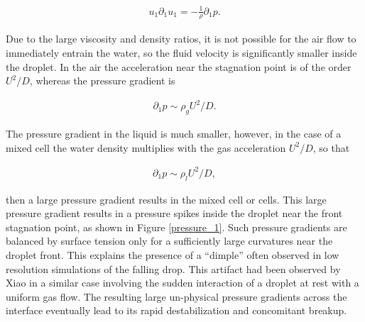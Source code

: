 \begin{align}
u_1 \partial_1 u_1 = - \frac 1 \rho \partial_1 p.
\end{align}

Due to the large viscosity and density ratios, it is not possible for 
the air flow to immediately entrain the water, so the fluid velocity 
is significantly smaller inside the droplet. 
In the air the acceleration near the stagnation point is 
of the order $U^2/D$, whereas the pressure gradient is

\begin{align}
\partial_1 p \sim \rho_{g} U^2/D.
\end{align}

The pressure gradient in the liquid is much smaller, 
however, in the case of a mixed cell the water density 
multiplies with the gas acceleration $U^2/D$, so that

\begin{align}
\partial_1 p \sim \rho_{l} U^2/D,
\end{align}

then a large pressure gradient results in the mixed cell or cells. 
This large pressure gradient results in a pressure spikes inside the 
droplet near the front stagnation point, as shown in Figure \ref{pressure_1}. 
Such pressure gradients are balanced by surface tension only for a sufficiently 
large curvatures near the droplet front. 
This explains the presence of a ``dimple'' often observed in low 
resolution simulations of the falling drop. 
This artifact had been observed by Xiao \cite{xiao2012} in a similar case
involving the sudden interaction of a droplet at rest with a uniform gas flow. 
The resulting large un-physical pressure gradients across the interface 
eventually lead to its rapid destabilization and concomitant breakup.  

